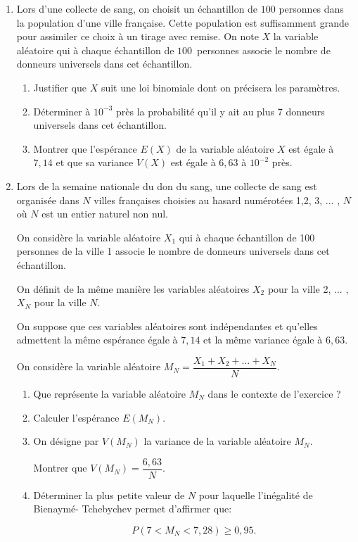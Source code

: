 \begin{enumerate}[resume]
\item Lors d'une collecte de sang, on choisit un échantillon de $100$ personnes dans la population d'une ville française. Cette population est suffisamment grande pour assimiler ce choix à un tirage avec remise.
On note $X$ la variable aléatoire qui à chaque échantillon de $100$~personnes
associe le nombre de donneurs universels dans cet échantillon.

	\begin{enumerate}
		\item Justifier que $X$ suit une loi binomiale dont on précisera les paramètres.
		\item Déterminer à $10^{-3}$ près la probabilité qu'il y ait au plus 7 donneurs universels
dans cet échantillon.
		\item Montrer que l'espérance $E(X)$ de la variable aléatoire $X$ est égale à $7,14$ et
que sa variance $V(X)$ est égale à $6,63$ à $10^{-2}$ près.
	\end{enumerate}
\item Lors de la semaine nationale du don du sang, une collecte de sang est organisée dans $N$ villes françaises choisies au hasard numérotées 1,2, 3, ... , $N$ où $N$ est un entier naturel non nul.

On considère la variable aléatoire $X_1$ qui à chaque échantillon de 100 personnes de la ville 1 associe le nombre de donneurs universels dans cet échantillon.

On définit de la même manière les variables aléatoires $X_2$ pour la ville 2, ... , $X_N$ pour la ville $N$.

On suppose que ces variables aléatoires sont indépendantes et qu'elles admettent la même espérance égale à $7,14$ et la même variance égale à $6,63$.

On considère la variable aléatoire $M_N = \dfrac{X_1 + X_2 + \ldots + X_N}{N}$.
	\begin{enumerate}
		\item Que représente la variable aléatoire $M_N$ dans le contexte de l'exercice ?
		\item Calculer l'espérance $E(M_N)$.
		\item On désigne par $V(M_N)$ la variance de la variable aléatoire $M_N$.

Montrer que $V(M_N) = \dfrac{6,63}{N}$.
		\item Déterminer la plus petite valeur de $N$ pour laquelle l'inégalité de Bienaymé- Tchebychev permet d'affirmer que:

\[P(7 < M_N < 7,28) \geqslant 0,95.\]

	\end{enumerate}
\end{enumerate}

\bigskip
